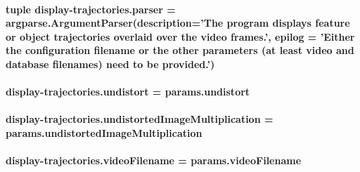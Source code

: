 \hypertarget{namespacedisplay-trajectories_ae474cf08ec327159b17d0b6ae3e64602}{
\paragraph[{parser}]{\setlength{\rightskip}{0pt plus 5cm}tuple display-\/trajectories.\-parser = argparse.\-Argument\-Parser(description='The program displays feature or object trajectories overlaid over the video frames.', epilog = 'Either the configuration filename or the other parameters (at least video and database filenames) need to be provided.')}}\label{namespacedisplay-trajectories_ae474cf08ec327159b17d0b6ae3e64602}
\hypertarget{namespacedisplay-trajectories_a252ba7661bb1423b9fb3404b78b2efb9}{
\paragraph[{undistort}]{\setlength{\rightskip}{0pt plus 5cm}display-\/trajectories.\-undistort = params.\-undistort}}\label{namespacedisplay-trajectories_a252ba7661bb1423b9fb3404b78b2efb9}
\hypertarget{namespacedisplay-trajectories_a7ba37ec5f26e7111c0120702cab55085}{
\paragraph[{undistorted\-Image\-Multiplication}]{\setlength{\rightskip}{0pt plus 5cm}display-\/trajectories.\-undistorted\-Image\-Multiplication = params.\-undistorted\-Image\-Multiplication}}\label{namespacedisplay-trajectories_a7ba37ec5f26e7111c0120702cab55085}
\hypertarget{namespacedisplay-trajectories_ac49ed52409b0ea70ec785d5d511ba23d}{
\paragraph[{video\-Filename}]{\setlength{\rightskip}{0pt plus 5cm}display-\/trajectories.\-video\-Filename = params.\-video\-Filename}}\label{namespacedisplay-trajectories_ac49ed52409b0ea70ec785d5d511ba23d}
